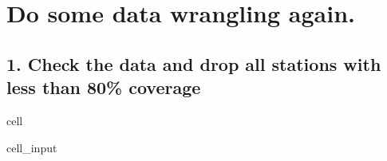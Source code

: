 \documentclass[letterpaper,10pt,english]{jupyterBook}
\begin{document}
\chapter{Do some data wrangling again.}
\label{\detokenize{notebooks/regional_and_local/SL_anomaly_annual:do-some-data-wrangling-again}}

\section{1. Check the data and drop all stations with less than 80\% coverage}
\label{\detokenize{notebooks/regional_and_local/SL_anomaly_annual:check-the-data-and-drop-all-stations-with-less-than-80-coverage}}
\begin{sphinxuseclass}{cell}\begin{sphinxVerbatimInput}

\begin{sphinxuseclass}{cell_input}
\begin{sphinxVerbatim}[commandchars=\\\{\}]
  

  

\end{sphinxVerbatim}

\end{sphinxuseclass}\end{sphinxVerbatimInput}
\begin{sphinxVerbatimOutput}


\end{sphinxVerbatimOutput}
\end{sphinxuseclass}
\end{document}
